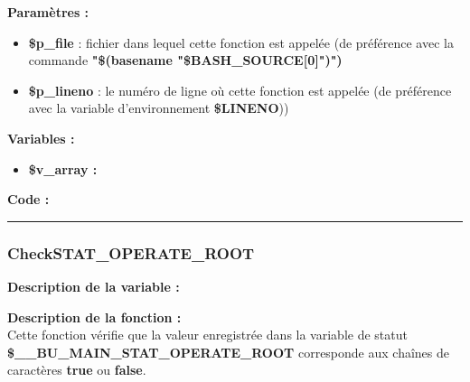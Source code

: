 \documentclass[a4paper,10pt]{article}
\begin{document}
\begin{justify}
    \textbf{Paramètres :}
    \begin{itemize}
        \item \color{orange}\textbf{\$p\_file}\color{white} : fichier dans lequel cette fonction est appelée (de préférence avec la commande \textbf{"\$(\color{gray}basename \color{white}"\color{orange}\$BASH\_SOURCE[0]\color{white}")")}\\

        \item \color{orange}\textbf{\$p\_lineno}\color{white} : le numéro de ligne où cette fonction est appelée (de préférence avec la variable d'environnement \textbf{\color{orange}\$LINENO}))
    \end{itemize}
\end{justify}

\begin{justify}
    \textbf{Variables :}

    \begin{itemize}
        \item \textbf{\color{orange}\$v\_array\color{white} :}
    \end{itemize}
\end{justify}

\begin{justify}
    \textbf{Code :}
\end{justify}



\color{blue}\par\noindent\rule{\textwidth}{0.4pt}\color{white}

\color{blue}
\subsubsection{CheckSTAT\_OPERATE\_ROOT}\color{white}

\begin{justify}
    \item \textbf{Description de la variable :}\\

\end{justify}

\begin{justify}
    \textbf{Description de la fonction :}\\
    Cette fonction vérifie que la valeur enregistrée dans la variable de statut\\ \textbf{\color{orange}\$\_\_BU\_MAIN\_STAT\_OPERATE\_ROOT} corresponde aux chaînes de caractères \textbf{true} ou \textbf{false}.
\end{justify}
\end{document}
